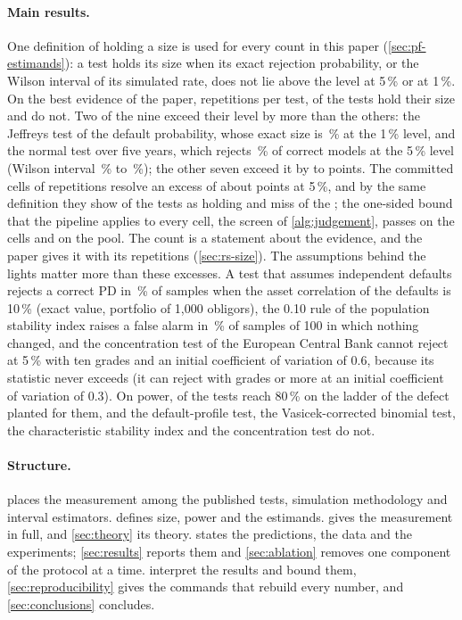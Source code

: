 \paragraph{Main results.}
One definition of holding a size is used for every count in this paper (\cref{sec:pf-estimands}): a test holds its size when its exact rejection probability, or the Wilson interval of its simulated rate, does not lie above the level at 5\,\% or at 1\,\%.
On the best evidence of the paper, \nRepsPooled{} repetitions per test, \nHold{} of the \nTests{} tests hold their size and \nNotHold{} do not.
Two of the nine exceed their level by more than the others: the Jeffreys test of the default probability, whose exact size is \jeffExactOne\,\% at the 1\,\% level, and the normal test over five years, which rejects \pooledNorm\,\% of correct models at the 5\,\% level (Wilson interval \pooledNormLo\,\% to \pooledNormHi\,\%); the other seven exceed it by \smallExcMin{} to \smallExcMax{} points.
The committed cells of \nNullReps{} repetitions resolve an excess of about \detIntFiveFour{} points at 5\,\%, and by the same definition they show \nHoldCellDef{} of the \nTests{} tests as holding and miss \nMissedByCell{} of the \nNotHold{}; the one-sided bound that the pipeline applies to every cell, the screen of \cref{alg:judgement}, passes \nHoldCellRule{} on the cells and \nHoldPoolRule{} on the pool.
The count is a statement about the evidence, and the paper gives it with its repetitions (\cref{sec:rs-size}).
The assumptions behind the lights matter more than these excesses.
A test that assumes independent defaults rejects a correct PD in \binRhoOneZeroExact\,\% of samples when the asset correlation of the defaults is 10\,\% (exact value, portfolio of 1,000 obligors), the 0.10 rule of the population stability index raises a false alarm in \psiHundred\,\% of samples of 100 in which nothing changed, and the concentration test of the European Central Bank cannot reject at 5\,\% with ten grades and an initial coefficient of variation of 0.6, because its statistic never exceeds \hhiPeak{} (it can reject with \hhiKMinThree{} grades or more at an initial coefficient of variation of 0.3).
On power, \nReach{} of the \nPowerTests{} tests reach 80\,\% on the ladder of the defect planted for them, and the default-profile test, the Vasicek-corrected binomial test, the characteristic stability index and the concentration test do not.

\paragraph{Structure.}
 places the measurement among the published tests, simulation methodology and interval estimators.
 defines size, power and the estimands.
 gives the measurement in full, and \cref{sec:theory} its theory.
 states the predictions, the data and the experiments; \cref{sec:results} reports them and \cref{sec:ablation} removes one component of the protocol at a time.
 interpret the results and bound them, \cref{sec:reproducibility} gives the commands that rebuild every number, and \cref{sec:conclusions} concludes.
